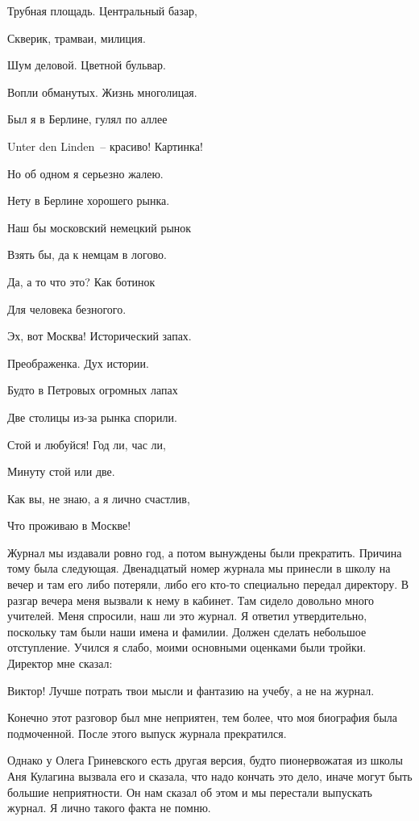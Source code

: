 {\itshape

Трубная площадь. Центральный базар,

Скверик, трамваи, милиция.

Шум деловой. Цветной бульвар.

Вопли обманутых. Жизнь многолицая.

\indent

Был я в Берлине, гулял по аллее 

Unter den Linden~-- красиво! Картинка!

Но об одном я серьезно жалею.

Нету в Берлине хорошего рынка.

\indent

Наш бы московский немецкий рынок 

Взять бы, да к немцам в логово.

Да, а то что это? Как ботинок 

Для человека безногого.


\indent

Эх, вот Москва! Исторический запах. 

Преображенка. Дух истории.

Будто в Петровых огромных лапах 

Две столицы из-за рынка спорили.

\indent

Стой и любуйся! Год ли, час ли,

Минуту стой или две.

Как вы, не знаю, а я лично счастлив,

Что проживаю в Москве!
}
\indent

Журнал мы издавали ровно год, а потом вынуждены были прекратить. Причина тому была следующая. Двенадцатый номер журнала мы принесли в школу на вечер и там его либо потеряли, либо его кто-то специально передал директору. В разгар вечера меня вызвали к нему в кабинет. Там сидело довольно много учителей. Меня спросили, наш ли это журнал. Я ответил утвердительно, поскольку там были наши имена и фамилии. Должен сделать небольшое отступление. Учился я слабо, моими основными оценками были тройки. Директор мне сказал:

Виктор! Лучше потрать твои мысли и фантазию на учебу, а не на журнал.

Конечно этот разговор был мне неприятен, тем более, что моя биография была подмоченной. После этого выпуск журнала прекратился.

Однако у Олега Гриневского есть другая версия, будто пионервожатая из школы Аня Кулагина вызвала его и сказала, что надо кончать это дело, иначе могут быть большие неприятности. Он нам сказал об этом и мы перестали выпускать журнал. Я лично такого факта не помню.

